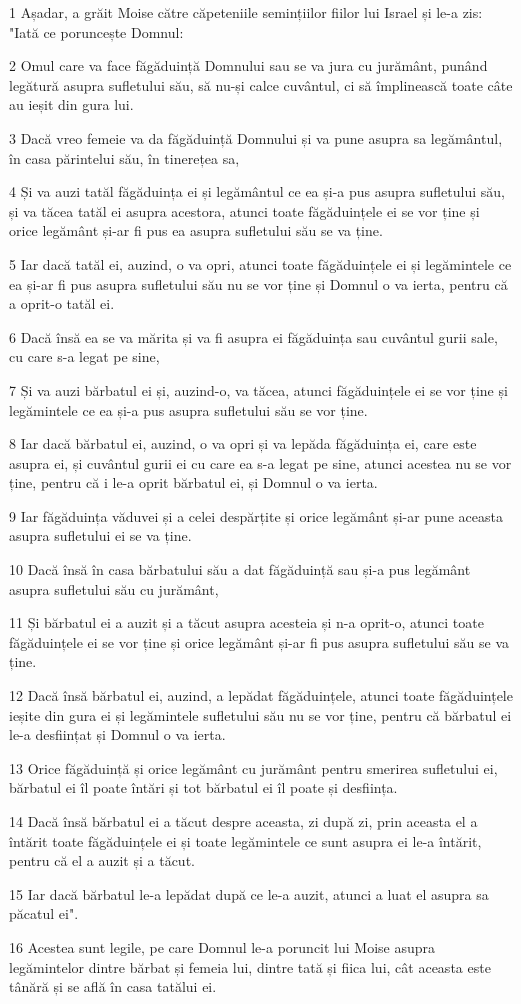\par 1 Așadar, a grăit Moise către căpeteniile semințiilor fiilor lui Israel și le-a zis: "Iată ce poruncește Domnul:
\par 2 Omul care va face făgăduință Domnului sau se va jura cu jurământ, punând legătură asupra sufletului său, să nu-și calce cuvântul, ci să împlinească toate câte au ieșit din gura lui.
\par 3 Dacă vreo femeie va da făgăduință Domnului și va pune asupra sa legământul, în casa părintelui său, în tinerețea sa,
\par 4 Și va auzi tatăl făgăduința ei și legământul ce ea și-a pus asupra sufletului său, și va tăcea tatăl ei asupra acestora, atunci toate făgăduințele ei se vor ține și orice legământ și-ar fi pus ea asupra sufletului său se va ține.
\par 5 Iar dacă tatăl ei, auzind, o va opri, atunci toate făgăduințele ei și legămintele ce ea și-ar fi pus asupra sufletului său nu se vor ține și Domnul o va ierta, pentru că a oprit-o tatăl ei.
\par 6 Dacă însă ea se va mărita și va fi asupra ei făgăduința sau cuvântul gurii sale, cu care s-a legat pe sine,
\par 7 Și va auzi bărbatul ei și, auzind-o, va tăcea, atunci făgăduințele ei se vor ține și legămintele ce ea și-a pus asupra sufletului său se vor ține.
\par 8 Iar dacă bărbatul ei, auzind, o va opri și va lepăda făgăduința ei, care este asupra ei, și cuvântul gurii ei cu care ea s-a legat pe sine, atunci acestea nu se vor ține, pentru că i le-a oprit bărbatul ei, și Domnul o va ierta.
\par 9 Iar făgăduința văduvei și a celei despărțite și orice legământ și-ar pune aceasta asupra sufletului ei se va ține.
\par 10 Dacă însă în casa bărbatului său a dat făgăduință sau și-a pus legământ asupra sufletului său cu jurământ,
\par 11 Și bărbatul ei a auzit și a tăcut asupra acesteia și n-a oprit-o, atunci toate făgăduințele ei se vor ține și orice legământ și-ar fi pus asupra sufletului său se va ține.
\par 12 Dacă însă bărbatul ei, auzind, a lepădat făgăduințele, atunci toate făgăduințele ieșite din gura ei și legămintele sufletului său nu se vor ține, pentru că bărbatul ei le-a desființat și Domnul o va ierta.
\par 13 Orice făgăduință și orice legământ cu jurământ pentru smerirea sufletului ei, bărbatul ei îl poate întări și tot bărbatul ei îl poate și desființa.
\par 14 Dacă însă bărbatul ei a tăcut despre aceasta, zi după zi, prin aceasta el a întărit toate făgăduințele ei și toate legămintele ce sunt asupra ei le-a întărit, pentru că el a auzit și a tăcut.
\par 15 Iar dacă bărbatul le-a lepădat după ce le-a auzit, atunci a luat el asupra sa păcatul ei".
\par 16 Acestea sunt legile, pe care Domnul le-a poruncit lui Moise asupra legămintelor dintre bărbat și femeia lui, dintre tată și fiica lui, cât aceasta este tânără și se află în casa tatălui ei.

